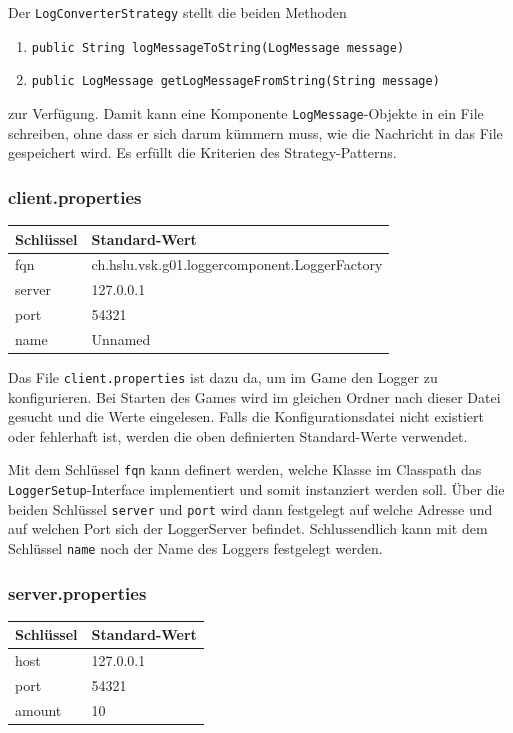 \documentclass[12pt,a4paper,twosided]{scrartcl}
\begin{document}
\newpage

Der \texttt{LogConverterStrategy} stellt die beiden Methoden

\begin{enumerate}
	\item \texttt{public String logMessageToString(LogMessage message)}
	\item \texttt{public LogMessage getLogMessageFromString(String message)}
\end{enumerate}

zur Verfügung. Damit kann eine Komponente \texttt{LogMessage}-Objekte in ein File schreiben, ohne dass er sich darum kümmern muss, wie die Nachricht in das File gespeichert wird. Es erfüllt die Kriterien des Strategy-Patterns.

\subsubsection{client.properties}
\begin{tabular}{|l|l|}
	\hline \textbf{Schlüssel} & \textbf{Standard-Wert}               \\ \hline
	fqn       & ch.hslu.vsk.g01.loggercomponent.LoggerFactory \\ \hline
	server    & 127.0.0.1                                     \\ \hline
	port      & 54321                                         \\ \hline
	name      & Unnamed                                       \\ \hline
\end{tabular}

Das File \texttt{client.properties} ist dazu da, um im Game den Logger zu konfigurieren. Bei Starten des Games wird im gleichen Ordner nach dieser Datei gesucht und die Werte eingelesen. Falls die Konfigurationsdatei nicht existiert oder fehlerhaft ist, werden die oben definierten Standard-Werte verwendet.

Mit dem Schlüssel \texttt{fqn} kann definert werden, welche Klasse im Classpath das \texttt{LoggerSetup}-Interface implementiert und somit instanziert werden soll. Über die beiden Schlüssel \texttt{server} und \texttt{port} wird dann festgelegt auf welche Adresse und auf welchen Port sich der LoggerServer befindet. Schlussendlich kann mit dem Schlüssel \texttt{name} noch der Name des Loggers festgelegt werden.

\subsubsection{server.properties}
\begin{tabular}{|l|l|}
	\hline \textbf{Schlüssel} & \textbf{Standard-Wert} \\ \hline
	host      & 127.0.0.1     \\ \hline
	port      & 54321         \\ \hline
	amount    & 10            \\ \hline 
\end{tabular}
\end{document}
